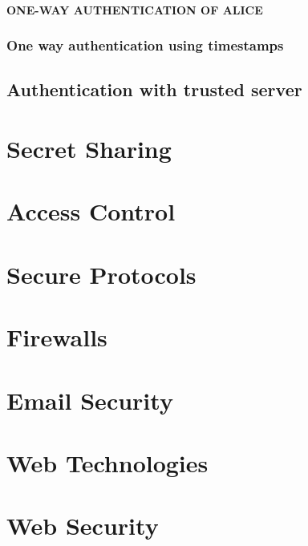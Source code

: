 	\paragraph{ONE-WAY AUTHENTICATION OF ALICE\\}
	
	
	
	\subsubsection{One way authentication using timestamps}
	
	\subsection{Authentication with trusted server}
	
	\newpage
	\section{Secret Sharing}

	\newpage
	\section{Access Control}

	\newpage
	\section{Secure Protocols}
	
	\newpage
	\section{Firewalls}

	\newpage
	\section{Email Security}

	\newpage
	\section{Web Technologies}	
	
	\newpage
	\section{Web Security}	
	
